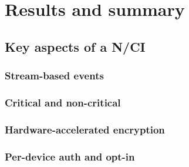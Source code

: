 \chapter{Results and summary}
\graphicspath{{Chapter5/Figs/}{Chapter5/Figs/}}


\section{Key aspects of a N/CI}
\label{chapter5-key-aspects}

\subsection{Stream-based events}
\label{chapter5-stream-based-events}

\subsection{Critical and non-critical}
\label{chapter5-critical-and-non-critical}

\subsection{Hardware-accelerated encryption}
\label{chapter5-hardware-accelerated-encryption}

\subsection{Per-device auth and opt-in}
\label{chapter5-user-side-opt-in}

